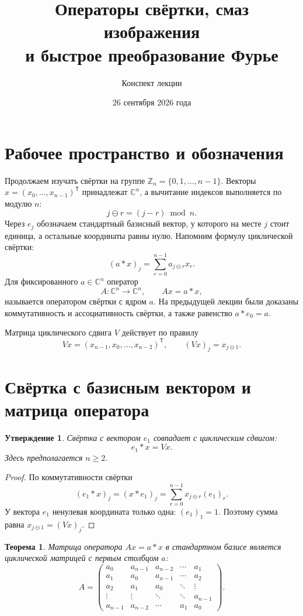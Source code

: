 \documentclass[12pt,a4paper]{article}
\title{Операторы свёртки, смаз изображения\\
и быстрое преобразование Фурье}
\author{Конспект лекции}
\date{26 сентября 2026 года}
\newtheorem{theorem}{Теорема}
\newtheorem{proposition}{Утверждение}
\theoremstyle{definition}
\theoremstyle{remark}
\newcommand{\CC}{\mathbb{C}}
\newcommand{\ZZ}{\mathbb{Z}}
\begin{document}
\maketitle

\section{Рабочее пространство и обозначения}

Продолжаем изучать свёртки на группе $\ZZ_n=\{0,1,\dots,n-1\}$.
Векторы $x=(x_0,\dots,x_{n-1})^{\mathsf T}$ принадлежат $\CC^n$,
а вычитание индексов выполняется по модулю $n$:
\[
  j\ominus r=(j-r)\bmod n.
\]
Через $e_j$ обозначаем стандартный базисный вектор, у которого на месте
$j$ стоит единица, а остальные координаты равны нулю. Напомним формулу
циклической свёртки:
\[
  (a*x)_j=\sum_{r=0}^{n-1}a_{j\ominus r}x_r.
\]
Для фиксированного $a\in\CC^n$ оператор
\[
  A\colon\CC^n\longrightarrow\CC^n,\qquad Ax=a*x,
\]
называется оператором свёртки с ядром $a$. На предыдущей лекции были
доказаны коммутативность и ассоциативность свёртки, а также равенство
$a*e_0=a$.

Матрица циклического сдвига $V$ действует по правилу
\[
  Vx=(x_{n-1},x_0,\dots,x_{n-2})^{\mathsf T},
  \qquad (Vx)_j=x_{j\ominus1}.
\]

\section{Свёртка с базисным вектором и матрица оператора}

\begin{proposition}
Свёртка с вектором $e_1$ совпадает с циклическим сдвигом:
\[
  e_1*x=Vx.
\]
Здесь предполагается $n\geqslant2$.
\end{proposition}

\begin{proof}
По коммутативности свёртки
\[
  (e_1*x)_j=(x*e_1)_j
  =\sum_{r=0}^{n-1}x_{j\ominus r}(e_1)_r.
\]
У вектора $e_1$ ненулевая координата только одна: $(e_1)_1=1$.
Поэтому сумма равна $x_{j\ominus1}=(Vx)_j$.
\end{proof}

\begin{theorem}
Матрица оператора $Ax=a*x$ в стандартном базисе является циклической
матрицей с первым столбцом $a$:
\[
  A=\begin{pmatrix}
    a_0 & a_{n-1} & a_{n-2} & \cdots & a_1\\
    a_1 & a_0 & a_{n-1} & \cdots & a_2\\
    a_2 & a_1 & a_0 & \ddots & \vdots\\
    \vdots & \vdots & \ddots & \ddots & a_{n-1}\\
    a_{n-1} & a_{n-2} & \cdots & a_1 & a_0
  \end{pmatrix}.
\]
\end{theorem}
\end{document}
